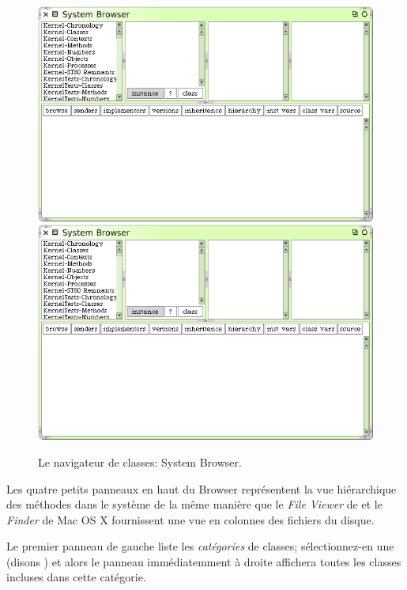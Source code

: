 \documentclass[a4paper,10pt,twoside]{book}
\begin{document}
\begin{figure}[htbp]
   \centering
   \ifluluelse
	 {\includegraphics[width=\textwidth]{SystemBrowser0} }
	 {\includegraphics[scale=.7]{SystemBrowser0} }
   \caption{Le navigateur de classes: System Browser.}
   \label{fig:SystemBrowser0}
\end{figure}

Les quatre petits panneaux en haut du Browser repr\'esentent la vue
hi\'erarchique des m\'ethodes dans le syst\`eme de la m\^eme
mani\`ere que le \textit{File Viewer} de  et le
\textit{Finder} de Mac OS X fournissent une vue en colonnes 
des fichiers du disque.

Le premier panneau de gauche liste les \emph{cat\'egories} de classes;
s\'electionnez-en une (disons ) et alors le
panneau imm\'ediatemment \`a droite affichera toutes les classes incluses
dans cette cat\'egorie.
\end{document}
